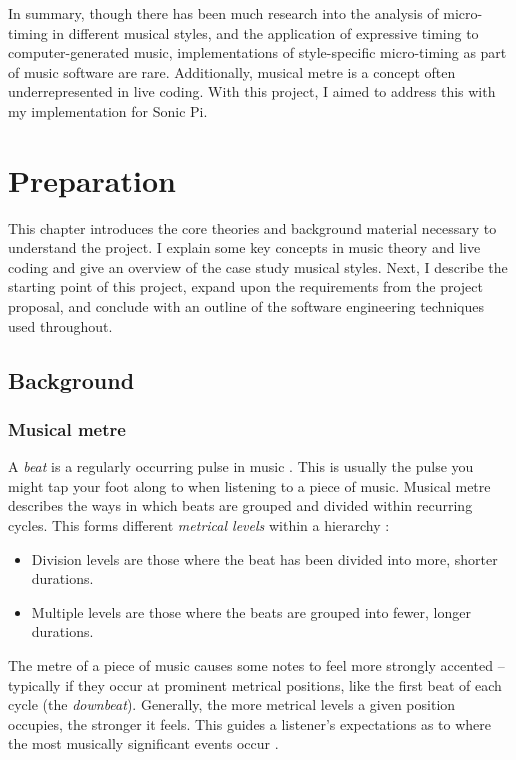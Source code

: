 \documentclass[12pt,twoside,openright]{report}
\begin{document}
In summary, though there has been much research into the analysis of
micro-timing in different musical styles, and the application of expressive
timing to computer-generated music, implementations of style-specific
micro-timing as part of music software are rare. Additionally, musical metre is
a concept often underrepresented in live coding. With this project, I aimed to
address this with my implementation for Sonic Pi.





\chapter{Preparation} \label{preparation}

This chapter introduces the core theories and background material necessary
to understand the project. I explain some key concepts in music theory and
live coding and give an overview of the case study musical styles. Next, I describe the starting point of this project, expand upon the requirements from
the project proposal, and conclude with an outline of the software engineering
techniques used throughout.



\section{Background} \label{background}


\subsection{Musical metre} \label{metre_background}

A \emph{beat} is a regularly occurring pulse in music \cite{omt2021}. This is usually the pulse you might tap your foot along to when listening to a piece of music. Musical metre
describes the ways in which beats are grouped and divided within recurring
cycles. This forms different \emph{metrical levels} within a hierarchy \cite{london2012}:

\begin{itemize}
    \item Division levels are those where the beat has been divided into more, shorter durations.
    \item Multiple levels are those where the beats are grouped into fewer, longer durations.
\end{itemize}

The metre of a piece of music causes some notes to feel more strongly accented \cite{london2012} -- typically if they occur at prominent metrical positions, like the first beat of each cycle (the \emph{downbeat}). Generally, the more metrical levels a given position occupies, the stronger it feels. This guides a listener's expectations as to where the most musically significant events occur \cite{london2012}.
\end{document}
